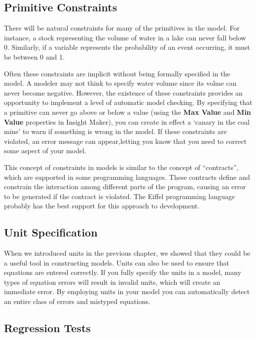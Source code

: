 \documentclass[]{memoir}
\renewcommand{\a}[1]{\textbf{#1}}
\begin{document}
\subsection{Primitive Constraints}

There will be natural constraints for many of the primitives in the
model. For instance, a stock representing the volume of water in a lake
can never fall below 0. Similarly, if a variable represents the
probability of an event occurring, it must be between 0 and 1.

Often these constraints are implicit without being formally specified in
the model. A modeler may not think to specify water volume since its
volme can never become negative. However, the existence of these
constraints provides an opportunity to implement a level of automatic
model checking. By specifying that a primitive can never go above or
below a value (using the \a{Max Value} and \a{Min Value} properties in
Insight Maker), you can create in effect a `canary in the coal mine' to
warn if something is wrong in the model. If these constraints are
violated, an error message can appear,letting you know that you need to
correct some aspect of your model.

This concept of constraints in models is similar to the concept of
``contracts'', which are supported in some programming languages. These
contracts define and constrain the interaction among different parts of
the program, causing an error to be generated if the contract is
violated. The Eiffel programming language probably has the best support
for this approach to development.

\subsection{Unit Specification}

When we introduced units in the previous chapter, we showed that they
could be a useful tool in constructing models. Units can also be used to
ensure that equations are entered correctly. If you fully specify the
units in a model, many types of equation errors will result in invalid
units, which will create an immediate error. By employing units in your
model you can automatically detect an entire class of errors and
mistyped equations.

\subsection{Regression Tests}
\end{document}
